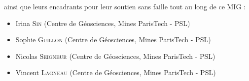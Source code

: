 \documentclass{article}
\begin{document}
ainsi que leurs encadrants pour leur soutien sans faille tout au long de ce MIG :
\begin{itemize}
    \item Irina \textsc{Sin} (Centre de Géosciences, Mines ParisTech - PSL)
    \item Sophie \textsc{Guillon} (Centre de Géosciences, Mines ParisTech - PSL)
    \item Nicolas \textsc{Seigneur} (Centre de Géosciences, Mines ParisTech - PSL)
    \item Vincent \textsc{Lagneau} (Centre de Géosciences, Mines ParisTech - PSL)
\end{itemize}

\end{document}

